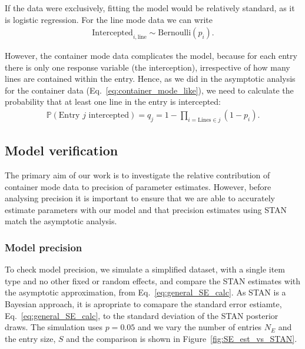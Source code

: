 \documentclass{article}
\begin{document}
If the data were exclusively, fitting the model would be relatively standard, as it is logistic regression. For the line mode data we can write
\begin{align}
\text{Intercepted}_{i,\text{line}} \sim \text{Bernoulli}(p_i).
\end{align}


However, the container mode data complicates the model, because for each entry there is only one response variable (the interception), irrespective of how many lines are contained within the entry. Hence, as we did in the asymptotic analysis for the container data (Eq.~\eqref{eq:container_mode_like}), we need to calculate the probability that at least one line in the entry is intercepted:
\begin{align}
\mathbb P(\text{Entry } j \text{ intercepted}) = q_j = 1 - \prod_{i=\text{Lines}\in j} (1-p_i).
\end{align}


\subsection{Model verification}
The primary aim of our work is to investigate the relative contribution of container mode data to precision of parameter estimates. However, before analysing precision it is important to ensure that we are able to accurately estimate parameters with our model and that precision estimates using STAN match the asymptotic analysis.
\subsubsection{Model precision}
To check model precision, we simulate a simplified dataset, with a single item type and no other fixed or random effects, and compare the STAN estimates with the asymptotic approximation, from Eq.~\eqref{eq:general_SE_calc}. As STAN is a Bayesian approach, it is apropriate to comapare the standard error estiamte, Eq.~\eqref{eq:general_SE_calc}, to the standard deviation of the STAN posterior draws. 
The simulation uses \(p=0.05\) and we vary the number of entries \(N_E\) and the entry size, \(S\) and the comparison is shown in Figure~\ref{fig:SE_est_vs_STAN}.
\end{document}
